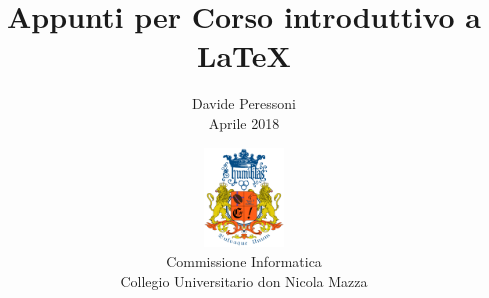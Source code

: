 \documentclass[a4paper,12pt]{article}
\newcommand{\1}{\ensuremath{\mathds{1}}}
\begin{document}
\title{Appunti per Corso introduttivo a \LaTeX}
\author{Davide Peressoni\\Aprile 2018}
\date{\includegraphics[height=100px]{ComInfo}\\Commissione Informatica\\Collegio Universitario don Nicola Mazza}
\maketitle


\restoregeometry\newpage
\tableofcontents
{} %
\label{contents}    %
\newpage
\end{document}
